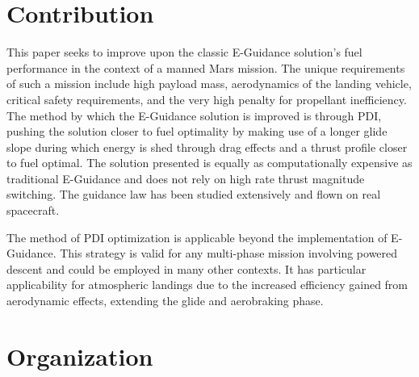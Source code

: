 \section{Contribution}
This paper seeks to improve upon the classic E-Guidance solution's fuel performance in the context of a manned Mars mission. The unique requirements of such a mission include high payload mass, aerodynamics of the landing vehicle, critical safety requirements, and the very high penalty for propellant inefficiency. The method by which the E-Guidance solution is improved is through PDI, pushing the solution closer to fuel optimality by making use of a longer glide slope during which energy is shed through drag effects and a thrust profile closer to fuel optimal. The solution presented is equally as computationally expensive as traditional E-Guidance and does not rely on high rate thrust magnitude switching. The guidance law has been studied extensively and flown on real spacecraft.

The method of PDI optimization is applicable beyond the implementation of E-Guidance. This strategy is valid for any multi-phase mission involving powered descent and could be employed in many other contexts. It has particular applicability for atmospheric landings due to the increased efficiency gained from aerodynamic effects, extending the glide and aerobraking phase.

\section{Organization}



